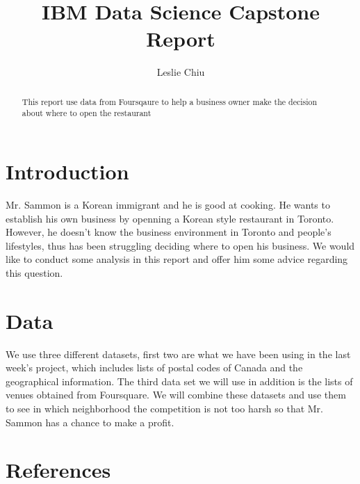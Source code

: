 \documentclass[12pt]{article}
\title{{IBM Data Science Capstone Report}
}
\author{Leslie Chiu}
\begin{document}
\maketitle


\begin{abstract}
This report use data from Foursqaure to help a business owner make the decision about where to open the restaurant
\end{abstract}

\section{Introduction}
Mr. Sammon is a Korean immigrant and he is good at cooking. He wants to establish his own business by openning a Korean style restaurant in Toronto. However, he doesn't know the business environment in Toronto and people's lifestyles, thus has been struggling deciding where to open his business. We would like to conduct some analysis in this report and offer him some advice regarding this question.

\section{Data}
We use three different datasets, first two are what we have been using in the last week's project, which includes lists of postal codes of Canada and the geographical information. The third data set we will use in addition is the lists of venues obtained from Foursquare. We will combine these datasets and use them to see in which neighborhood the competition is not too harsh so that Mr. Sammon has a chance to make a profit.

\section {References}


%
\end{document}
